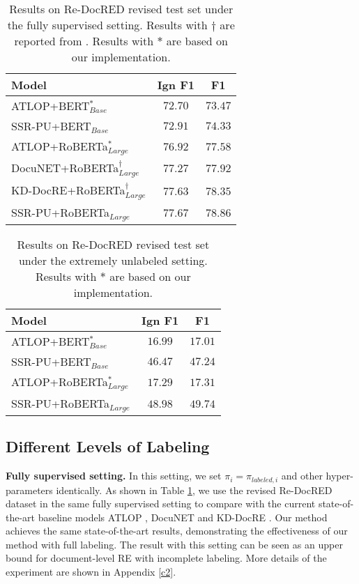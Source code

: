 \documentclass[11pt]{article}
\begin{document}
\begin{table}
\centering
\begin{tabular}{lcc}
\hline \textbf{Model} & \textbf{Ign F1} & \textbf{F1} \\
\hline ATLOP+BERT$_{Base}^{\ast}$ & $72.70$ & $73.47$ \\
SSR-PU+BERT$_{Base}$ & $\mathbf{72.91}$ & $\mathbf{74.33}$ \\
\hline ATLOP+RoBERTa$_{Large}^{\ast}$ & $76.92$ & $77.58$ \\
DocuNET+RoBERTa$_{Large}^{\dagger}$ & $77.27$ & $77.92$ \\
KD-DocRE+RoBERTa$_{Large}^{\dagger}$ & $77.63$ & $78.35$ \\
SSR-PU+RoBERTa$_{Large}$ & $\mathbf{77.67}$ & $\mathbf{78.86}$ \\
\hline
\end{tabular}
\caption{\label{table2}
Results on Re-DocRED revised test set under the fully supervised setting. Results with $\dagger$ are reported from \citep{tan2022revisiting}. Results with $\ast$ are based on our implementation.
}
\end{table}

\begin{table}
\centering
\begin{tabular}{lcc}
\hline \textbf{Model} & \textbf{Ign F1} & \textbf{F1} \\
\hline ATLOP+BERT$_{Base}^{\ast}$ & $16.99$ & $17.01$ \\
SSR-PU+BERT$_{Base}$ & $\mathbf{46.47}$ & $\mathbf{47.24}$ \\
\hline ATLOP+RoBERTa$_{Large}^{\ast}$ & $17.29$ & $17.31$ \\
SSR-PU+RoBERTa$_{Large}$ & $\mathbf{48.98}$ & $\mathbf{49.74}$ \\
\hline
\end{tabular}
\caption{\label{table3}
Results on Re-DocRED revised test set under the extremely unlabeled setting. Results with $\ast$ are based on our implementation.
}
\end{table}

\subsection{Different Levels of Labeling}

\textbf{Fully supervised setting.} \enspace In this setting, we set $\pi_{i}=\pi_{labeled,i}$ and other hyper-parameters identically. As shown in Table \ref{table2}, we use the \citep{tan2022revisiting} revised Re-DocRED dataset in the same fully supervised setting to compare with the current state-of-the-art baseline models ATLOP \citep{Zhou_Huang_Ma_Huang_2021}, DocuNET \citep{ijcai2021p551} and KD-DocRE \citep{tan-etal-2022-document}. Our method achieves the same state-of-the-art results, demonstrating the effectiveness of our method with full labeling. The result with this setting can be seen as an upper bound for document-level RE with incomplete labeling. More details of the experiment are shown in Appendix \ref{c2}.
\end{document}
